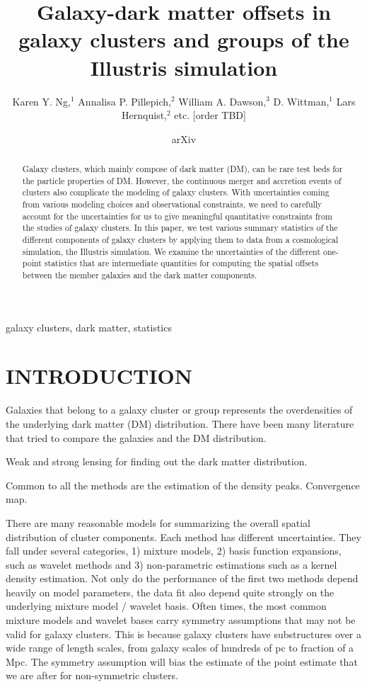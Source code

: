\documentclass[usenatbib]{mn2e}
\title[Galaxy-dark matter offsets in galaxy clusters and groups of the
Illustris simulation]
{Galaxy-dark matter offsets in galaxy clusters and groups of the
Illustris simulation}
\author[Karen Y. Ng et al.]{Karen Y. Ng,$^{1}$
	Annalisa P. Pillepich,$^{2}$ 
	William A. Dawson,$^{3}$ 
	D. Wittman,$^{1}$
	\newauthor Lars Hernquist,$^{2}$
	etc. [order TBD]
}
\begin{document}
\date{arXiv} \pagerange{\pageref{firstpage}--\pageref{lastpage}}
 \maketitle\label{firstpage}
\begin{abstract} 
	Galaxy clusters, which mainly compose of dark matter (DM), 
	can be rare test beds for the particle properties of DM.
	However, the continuous merger and accretion events of clusters also
	complicate the modeling of galaxy clusters.
	With uncertainties coming from various modeling choices and observational constraints, 
	we need to carefully account for the
	uncertainties for us to give meaningful quantitative constraints from 
	the studies of galaxy clusters. In this paper, 
	we test various summary statistics of the different components
	of galaxy clusters by applying them to data from a cosmological simulation,
	the Illustris simulation. 
	We examine the uncertainties of the different one-point statistics that
	are intermediate quantities for computing the spatial offsets between
	the member galaxies and the dark matter components. 
\end{abstract}

\begin{keywords}
	galaxy clusters, dark matter, statistics 
\end{keywords}

\section{INTRODUCTION} 
Galaxies that belong to a galaxy cluster or group represents the overdensities
of the underlying dark matter (DM) distribution. 
There have been many literature that tried to compare the galaxies and the DM
distribution. 


Weak and strong lensing for finding out the dark matter distribution. 

Common to all the methods are the estimation of the density peaks. 
Convergence map.  


There are many reasonable models for summarizing the overall spatial
distribution of cluster components. Each method has different uncertainties.
They fall under several categories, 1) mixture models, 2) basis function
expansions, such as wavelet methods and 3) non-parametric estimations 
such as a kernel density estimation. Not only do the performance of the 
first two methods depend heavily on model parameters, 
the data fit also depend quite strongly on the underlying mixture model /
wavelet basis. Often times, the most common mixture models and wavelet bases 
carry symmetry assumptions that may not be valid for galaxy clusters. 
This is because galaxy clusters have substructures over a wide range of length
scales, from galaxy scales of hundreds of pc to fraction of a Mpc. 
The symmetry assumption will bias the estimate of the point estimate that we
are after for non-symmetric clusters.
\end{document}
